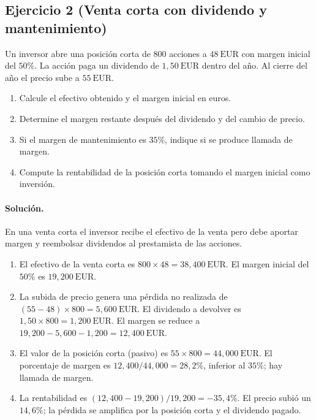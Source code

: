 \documentclass[12pt,a4paper]{article}
\newcommand{\EUR}[1]{\ensuremath{#1~\text{EUR}}}
\newenvironment{ejercicio}[1]{\subsection*{Ejercicio #1}}{}
\newenvironment{solucion}{\paragraph{Solución.}}{}
\begin{document}
 \begin{ejercicio}{2 (Venta corta con dividendo y mantenimiento)}
 Un inversor abre una posición corta de \(800\) acciones a \EUR{48} con margen inicial del \(50\%\). La acción paga un dividendo de \EUR{1{,}50} dentro del año. Al cierre del año el precio sube a \EUR{55}.
 \begin{enumerate}[label=\alph*)]
   \item Calcule el efectivo obtenido y el margen inicial en euros.
   \item Determine el margen restante después del dividendo y del cambio de precio.
   \item Si el margen de mantenimiento es \(35\%\), indique si se produce llamada de margen.
   \item Compute la rentabilidad de la posición corta tomando el margen inicial como inversión.
 \end{enumerate}
 \end{ejercicio}
 \begin{solucion}
 En una venta corta el inversor recibe el efectivo de la venta pero debe aportar margen y reembolsar dividendos al prestamista de las acciones.
 \begin{enumerate}[label=\alph*)]
   \item El efectivo de la venta corta es \(800\times 48 = \EUR{38{,}400}\). El margen inicial del \(50\%\) es \(\EUR{19{,}200}\).
   \item La subida de precio genera una pérdida no realizada de \( (55-48)\times 800 = \EUR{5{,}600}\). El dividendo a devolver es \(1{,}50\times 800 = \EUR{1{,}200}\). El margen se reduce a \(19{,}200 - 5{,}600 - 1{,}200 = \EUR{12{,}400}\).
   \item El valor de la posición corta (pasivo) es \(55\times 800 = \EUR{44{,}000}\). El porcentaje de margen es \(12{,}400/44{,}000 = 28{,}2\%\), inferior al \(35\%\); hay llamada de margen.
   \item La rentabilidad es \((12{,}400-19{,}200)/19{,}200 = -35{,}4\%\). El precio subió un \(14{,}6\%\); la pérdida se amplifica por la posición corta y el dividendo pagado.
 \end{enumerate}
 \end{solucion}
\end{document}

